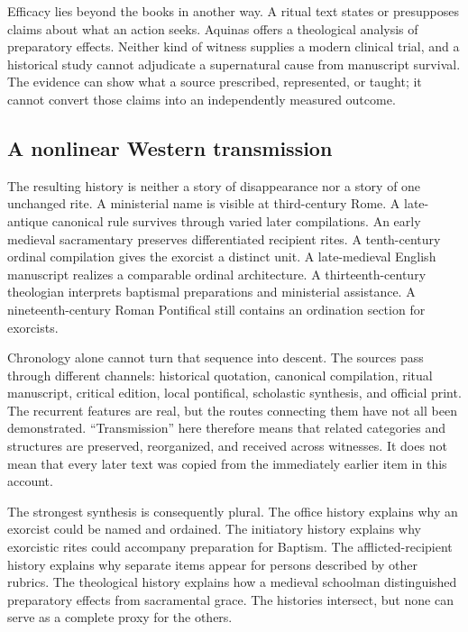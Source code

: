 Efficacy lies beyond the books in another way. A ritual text states or
presupposes claims about what an action seeks. Aquinas offers a theological
analysis of preparatory effects. Neither kind of witness supplies a modern
clinical trial, and a historical study cannot adjudicate a supernatural cause
from manuscript survival. The evidence can show what a source prescribed,
represented, or taught; it cannot convert those claims into an independently
measured outcome.

\subsection{A nonlinear Western transmission}

The resulting history is neither a story of disappearance nor a story of one
unchanged rite. A ministerial name is visible at third-century Rome. A
late-antique canonical rule survives through varied later compilations. An
early medieval sacramentary preserves differentiated recipient rites. A
tenth-century ordinal compilation gives the exorcist a distinct unit. A
late-medieval English manuscript realizes a comparable ordinal architecture.
A thirteenth-century theologian interprets baptismal preparations and
ministerial assistance. A nineteenth-century Roman Pontifical still contains
an ordination section for exorcists.

Chronology alone cannot turn that sequence into descent. The sources pass
through different channels: historical quotation, canonical compilation,
ritual manuscript, critical edition, local pontifical, scholastic synthesis,
and official print. The recurrent features are real, but the routes connecting
them have not all been demonstrated. ``Transmission'' here therefore means
that related categories and structures are preserved, reorganized, and
received across witnesses. It does not mean that every later text was copied
from the immediately earlier item in this account.

The strongest synthesis is consequently plural. The office history explains
why an exorcist could be named and ordained. The initiatory history explains
why exorcistic rites could accompany preparation for Baptism. The
afflicted-recipient history explains why separate items appear for persons
described by other rubrics. The theological history explains how a medieval
schoolman distinguished preparatory effects from sacramental grace. The
histories intersect, but none can serve as a complete proxy for the others.

